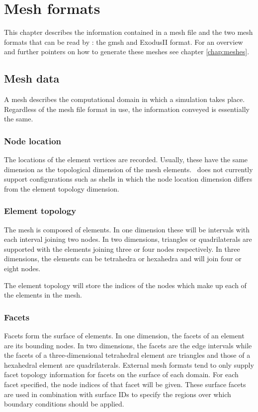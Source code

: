 \chapter{Mesh formats}\label{chap:mesh_formats}

This chapter describes the information contained in a mesh file and the 
two mesh formats that can be read by \fluidity: the gmsh and
ExodusII format.
For an overview and further pointers on how to generate these meshes
see chapter \ref{chap:meshes}.

\section{Mesh data}

A mesh describes the computational domain in which a simulation takes
place. Regardless of the mesh file format in use, the information conveyed
is essentially the same.

\subsection{Node location}

The locations of the element vertices are recorded. Usually, these have the
same dimension as the topological dimension of the mesh elements. \fluidity\
does not currently support configurations such as shells in which the node
location dimension differs from the element topology dimension.

\subsection{Element topology}

The mesh is composed of elements. In one dimension these will be intervals
with each interval joining two nodes. In two dimensions, triangles or
quadrilaterals are supported with the elements joining three or four nodes
respectively. In three dimensions, the elements can be tetrahedra or
hexahedra and will join four or eight nodes.

The element topology will store the indices of the nodes which make up
each of the elements in the mesh.

\subsection{Facets}

Facets form the surface of elements. In one dimension, the facets of an
element are its bounding nodes. In two dimensions, the facets are the edge
intervals while the facets of a three-dimensional tetrahedral element are
triangles and those of a hexahedral element are quadrilaterals. External
mesh formats tend to only supply facet topology information for facets on
the surface of each domain. For each facet specified, the node indices of
that facet will be given. These surface facets are used in combination with
surface IDs to specify the regions over which boundary conditions should be
applied.

